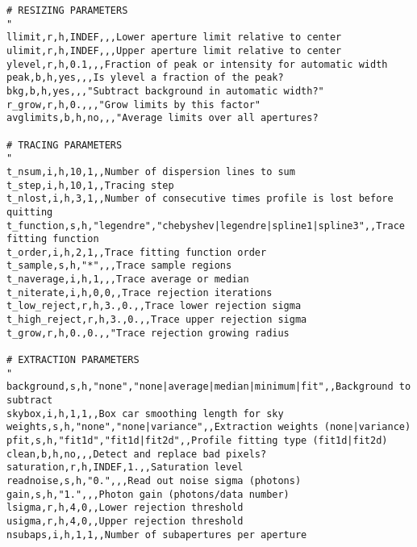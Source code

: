 \begin{verbatim}
# RESIZING PARAMETERS
"
llimit,r,h,INDEF,,,Lower aperture limit relative to center
ulimit,r,h,INDEF,,,Upper aperture limit relative to center
ylevel,r,h,0.1,,,Fraction of peak or intensity for automatic width
peak,b,h,yes,,,Is ylevel a fraction of the peak?
bkg,b,h,yes,,,"Subtract background in automatic width?"
r_grow,r,h,0.,,,"Grow limits by this factor"
avglimits,b,h,no,,,"Average limits over all apertures?

# TRACING PARAMETERS
"
t_nsum,i,h,10,1,,Number of dispersion lines to sum
t_step,i,h,10,1,,Tracing step
t_nlost,i,h,3,1,,Number of consecutive times profile is lost before quitting
t_function,s,h,"legendre","chebyshev|legendre|spline1|spline3",,Trace fitting function
t_order,i,h,2,1,,Trace fitting function order
t_sample,s,h,"*",,,Trace sample regions
t_naverage,i,h,1,,,Trace average or median
t_niterate,i,h,0,0,,Trace rejection iterations
t_low_reject,r,h,3.,0.,,Trace lower rejection sigma
t_high_reject,r,h,3.,0.,,Trace upper rejection sigma
t_grow,r,h,0.,0.,,"Trace rejection growing radius

# EXTRACTION PARAMETERS
"
background,s,h,"none","none|average|median|minimum|fit",,Background to subtract
skybox,i,h,1,1,,Box car smoothing length for sky
weights,s,h,"none","none|variance",,Extraction weights (none|variance)
pfit,s,h,"fit1d","fit1d|fit2d",,Profile fitting type (fit1d|fit2d)
clean,b,h,no,,,Detect and replace bad pixels?
saturation,r,h,INDEF,1.,,Saturation level
readnoise,s,h,"0.",,,Read out noise sigma (photons)
gain,s,h,"1.",,,Photon gain (photons/data number)
lsigma,r,h,4,0,,Lower rejection threshold
usigma,r,h,4,0,,Upper rejection threshold
nsubaps,i,h,1,1,,Number of subapertures per aperture
\end{verbatim}
\endgroup








